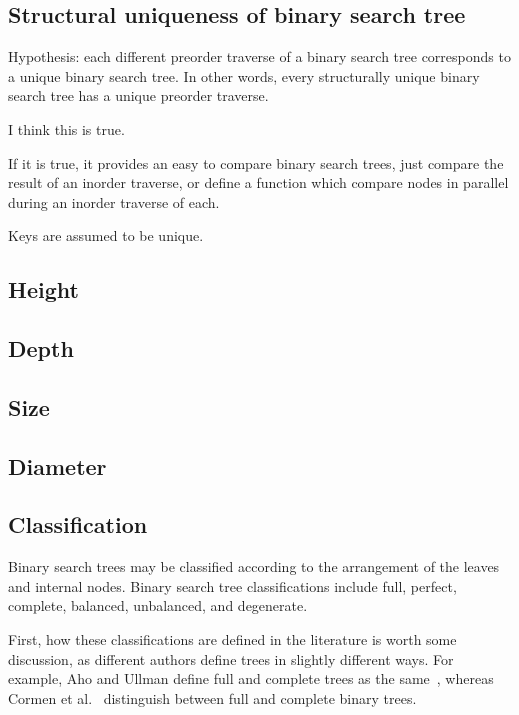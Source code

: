 \subsection{Structural uniqueness of binary search tree}

Hypothesis: each different preorder traverse of a binary search
tree corresponds to a unique binary search tree. In other words,
every structurally unique binary search
tree has a unique preorder traverse.

I think this is true.

If it is true, it provides an easy to compare binary
search trees, just compare the result of an inorder
traverse, or define a function which compare nodes in
parallel during an inorder traverse of each.

Keys are assumed to be unique.

\subsection{Height}

\subsection{Depth}

\subsection{Size}

\subsection{Diameter}

\subsection{Classification}

Binary search trees may be classified according to the
arrangement of the leaves and internal nodes.
Binary search tree classifications include
full, perfect, complete, balanced, unbalanced, and degenerate.

First, how these classifications are defined in the literature is
worth some discussion, as different authors define trees in slightly
different ways. For example, Aho and Ullman define full and complete
trees as the same~\cite[p. 257]{aho:av:1992}, whereas Cormen
et al.~\cite[p. 1178]{cormen:th2009} distinguish between full and
complete binary trees.

